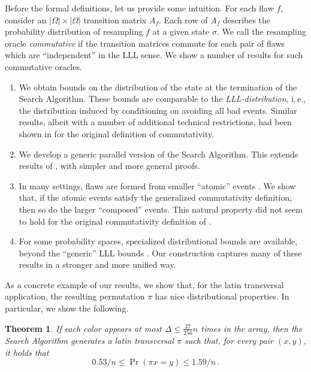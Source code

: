 \documentclass[11pt]{article}
\newtheorem{theorem}{Theorem}[section]
\newcommand{\ie}{i.\,e.}
\begin{document}
Before the formal definitions,  let us provide some intuition. For each flaw $f$, consider an $| \Omega | \times |\Omega |$ transition matrix $A_f$. Each row of $A_f$   describes the probability distribution of resampling $f$ at a given state $\sigma$.  We call the resampling oracle \emph{commutative} if the transition matrices commute for
%
each  %
pair of flaws which are ``independent'' in the LLL sense. We show a number of results for such  commutative oracles. %
%
\begin{enumerate} 

%
\item We obtain bounds on the distribution of the state at the termination of the Search Algorithm. These bounds are comparable to the \emph{LLL-distribution}, \ie, the distribution induced by conditioning on avoiding all bad events. Similar results, albeit with a number of additional technical restrictions, had been shown in \cite{LLLWTL} for the original definition of commutativity. 

\item We develop a generic parallel version of the Search Algorithm. This extends results of \cite{Kolmofocs, ParallelHarris}, with simpler and more general proofs.

\item In many settings, flaws are formed from smaller ``atomic'' events \cite{ParallelHarris}. We show that, if the atomic events satisfy the generalized commutativity definition, then so do the larger ``composed'' events. This natural property did not seem to hold for the original commutativity definition of \cite{Kolmofocs}.

\item For some probability spaces, specialized distributional  bounds  are available,  beyond the ``generic'' LLL bounds \cite{NewBoundsHarris}.  Our construction captures many of these results in a stronger and more unified way.
%
\end{enumerate}

As a concrete example of our results, we show that, for the latin transversal application, the resulting permutation $\pi$ has nice distributional properties. In particular, we show the following.  %

\begin{theorem}
\label{perm-thm44}
If each color appears at most $\Delta \leq \frac{27}{256} n$ times in the array, then the Search Algorithm generates a latin transversal $\pi$ such that, for every pair $(x,y)$, it holds that $$
0.53/n \leq \Pr( \pi x = y ) \leq 1.59/n\,.  %
$$                       %
\end{theorem}
\end{document}
